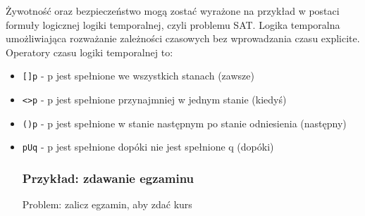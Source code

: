 \documentclass[a4paper,12pt]{article}
\begin{document}
Żywotność oraz bezpieczeństwo mogą zostać wyrażone na przykład w postaci formuły logicznej logiki temporalnej, czyli problemu SAT. Logika temporalna umożliwiająca rozważanie zależności czasowych bez wprowadzania czasu explicite. Operatory czasu logiki temporalnej to:
\begin{itemize}
  \item \texttt{[]p} - p jest spełnione we wszystkich stanach (zawsze)
  \item \texttt{<>p} - p jest spełnione przynajmniej w jednym stanie (kiedyś)
  \item \texttt{()p} - p jest spełnione w stanie następnym po stanie odniesienia (następny)
  \item \texttt{pUq} - p jest spełnione dopóki nie jest spełnione q (dopóki)

%
%
%
%
%
%
%
%
%

\subsubsection{Przykład: zdawanie egzaminu}

\noindent
Problem: zalicz egzamin, aby zdać kurs


\end{itemize}
\end{document}
